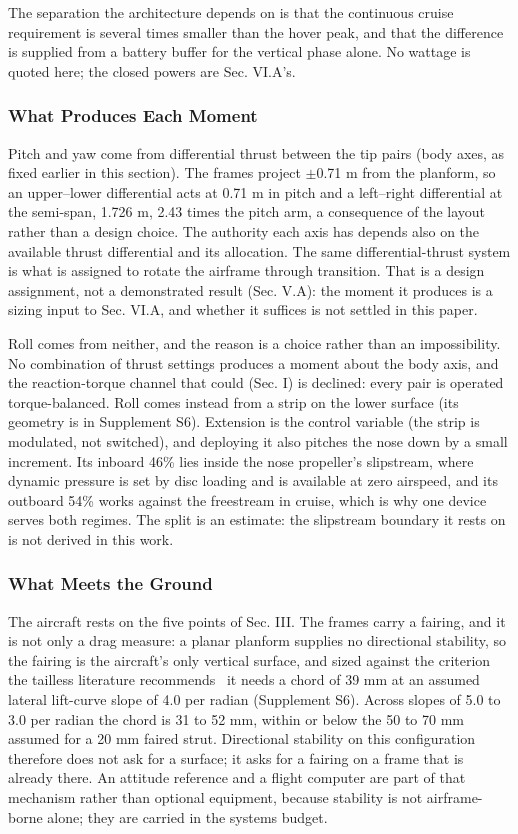 \documentclass[journal]{new-aiaa}
\begin{document}
The separation the architecture depends on is that the continuous cruise requirement is several times smaller than the hover peak, and that the difference is supplied from a battery buffer for the vertical phase alone. No wattage is quoted here; the closed powers are Sec. VI.A's.

\subsubsection{What Produces Each Moment}

Pitch and yaw come from differential thrust between the tip pairs (body axes, as fixed earlier in this section). The frames project $\pm$0.71 m from the planform, so an upper--lower differential acts at 0.71 m in pitch and a left--right differential at the semi-span, 1.726 m, 2.43 times the pitch arm, a consequence of the layout rather than a design choice. The authority each axis has depends also on the available thrust differential and its allocation. The same differential-thrust system is what is assigned to rotate the airframe through transition. That is a design assignment, not a demonstrated result (Sec. V.A): the moment it produces is a sizing input to Sec. VI.A, and whether it suffices is not settled in this paper.

Roll comes from neither, and the reason is a choice rather than an impossibility. No combination of thrust settings produces a moment about the body axis, and the reaction-torque channel that could (Sec. I) is declined: every pair is operated torque-balanced. Roll comes instead from a strip on the lower surface (its geometry is in Supplement S6). Extension is the control variable (the strip is modulated, not switched), and deploying it also pitches the nose down by a small increment. Its inboard 46\% lies inside the nose propeller's slipstream, where dynamic pressure is set by disc loading and is available at zero airspeed, and its outboard 54\% works against the freestream in cruise, which is why one device serves both regimes. The split is an estimate: the slipstream boundary it rests on is not derived in this work.

\subsubsection{What Meets the Ground}

The aircraft rests on the five points of Sec. III. The frames carry a fairing, and it is not only a drag measure: a planar planform supplies no directional stability, so the fairing is the aircraft's only vertical surface, and sized against the criterion the tailless literature recommends~\cite{r24} it needs a chord of 39 mm at an assumed lateral lift-curve slope of 4.0 per radian (Supplement S6). Across slopes of 5.0 to 3.0 per radian the chord is 31 to 52 mm, within or below the 50 to 70 mm assumed for a 20 mm faired strut. Directional stability on this configuration therefore does not ask for a surface; it asks for a fairing on a frame that is already there. An attitude reference and a flight computer are part of that mechanism rather than optional equipment, because stability is not airframe-borne alone; they are carried in the systems budget.
\end{document}
